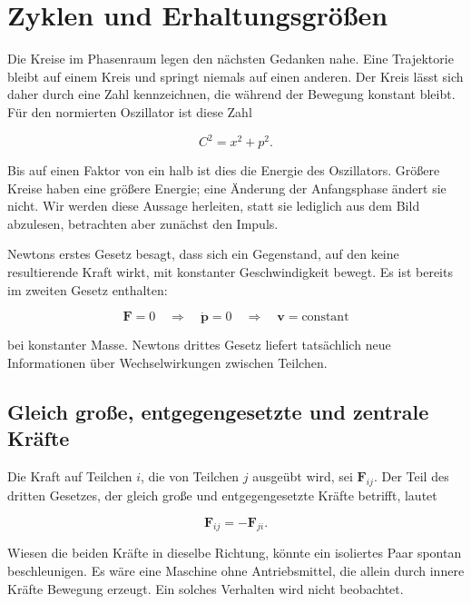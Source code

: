 \section{Zyklen und Erhaltungsgrößen}

Die Kreise im Phasenraum legen den nächsten Gedanken nahe. Eine Trajektorie bleibt auf einem Kreis und springt niemals auf einen anderen. Der Kreis lässt sich daher durch eine Zahl kennzeichnen, die während der Bewegung konstant bleibt. Für den normierten Oszillator ist diese Zahl

\begin{equation}
  C^2=x^2+p^2.
  \label{eq:cycle-label}
\end{equation}

Bis auf einen Faktor von ein halb ist dies die Energie des Oszillators. Größere Kreise haben eine größere Energie; eine Änderung der Anfangsphase ändert sie nicht. Wir werden diese Aussage herleiten, statt sie lediglich aus dem Bild abzulesen, betrachten aber zunächst den Impuls.

Newtons erstes Gesetz besagt, dass sich ein Gegenstand, auf den keine resultierende Kraft wirkt, mit konstanter Geschwindigkeit bewegt. Es ist bereits im zweiten Gesetz enthalten:

\begin{equation}
  \mathbf F=0
  \quad\Longrightarrow\quad
  \dot{\mathbf p}=0
  \quad\Longrightarrow\quad
  \mathbf v=\text{constant}
  \label{eq:newton-first-from-second}
\end{equation}

bei konstanter Masse. Newtons drittes Gesetz liefert tatsächlich neue Informationen über Wechselwirkungen zwischen Teilchen.

\subsection{Gleich große, entgegengesetzte und zentrale Kräfte}

Die Kraft auf Teilchen \(i\), die von Teilchen \(j\) ausgeübt wird, sei \(\mathbf F_{ij}\). Der Teil des dritten Gesetzes, der gleich große und entgegengesetzte Kräfte betrifft, lautet

\begin{equation}
  \mathbf F_{ij}=-\mathbf F_{ji}.
  \label{eq:newton-third-pair}
\end{equation}

Wiesen die beiden Kräfte in dieselbe Richtung, könnte ein isoliertes Paar spontan beschleunigen. Es wäre eine Maschine ohne Antriebsmittel, die allein durch innere Kräfte Bewegung erzeugt. Ein solches Verhalten wird nicht beobachtet.

